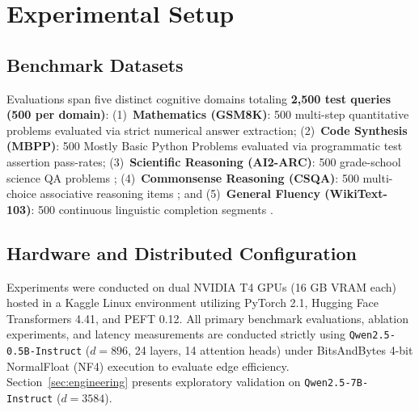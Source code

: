 \documentclass[journal,10pt,twocolumn]{IEEEtran}
\begin{document}
\section{Experimental Setup}

\subsection{Benchmark Datasets}
Evaluations span five distinct cognitive domains totaling \textbf{2,500 test queries (500 per domain)}: (1)~\textbf{Mathematics (GSM8K)}: 500 multi-step quantitative problems \cite{cobbe2021gsm8k} evaluated via strict numerical answer extraction; (2)~\textbf{Code Synthesis (MBPP)}: 500 Mostly Basic Python Problems \cite{austin2021mbpp} evaluated via programmatic test assertion pass-rates; (3)~\textbf{Scientific Reasoning (AI2-ARC)}: 500 grade-school science QA problems \cite{clark2018arc}; (4)~\textbf{Commonsense Reasoning (CSQA)}: 500 multi-choice associative reasoning items \cite{talmor2019commonsenseqa}; and (5)~\textbf{General Fluency (WikiText-103)}: 500 continuous linguistic completion segments \cite{merity2017wikitext}.

\subsection{Hardware and Distributed Configuration}
Experiments were conducted on dual NVIDIA T4 GPUs (16 GB VRAM each) hosted in a Kaggle Linux environment utilizing PyTorch 2.1, Hugging Face Transformers 4.41, and PEFT 0.12. All primary benchmark evaluations, ablation experiments, and latency measurements are conducted strictly using \texttt{Qwen2.5-0.5B-Instruct} ($d=896$, 24 layers, 14 attention heads) under BitsAndBytes 4-bit NormalFloat (NF4) execution to evaluate edge efficiency. Section~\ref{sec:engineering} presents exploratory validation on \texttt{Qwen2.5-7B-Instruct} ($d=3584$).
\end{document}
